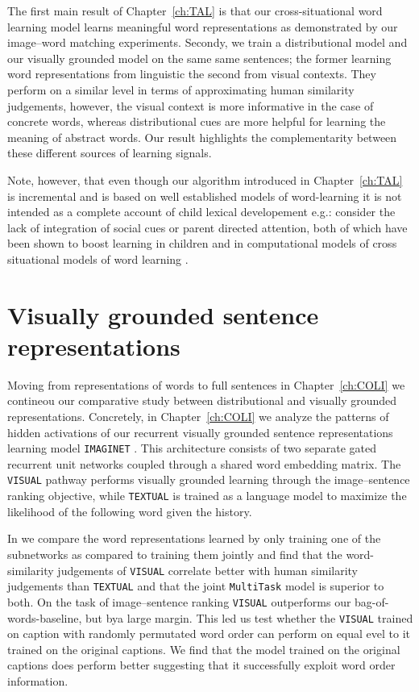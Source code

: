 The first main result of Chapter~\ref{ch:TAL} is that our cross-situational word learning model learns
meaningful word representations as demonstrated by our image--word matching experiments. 
Secondy, we train a distributional model and our visually grounded model on the same same sentences;
the former learning word representations from linguistic the second from visual contexts. 
They perform on a similar level in terms of approximating human similarity judgements, however,
the visual context is more informative in the case of concrete words, whereas distributional cues 
are more helpful for learning the meaning of abstract words. Our result highlights the complementarity
between these different sources of learning signals.

Note, however, that even though our algorithm introduced in Chapter~\ref{ch:TAL} is incremental
and is based on well established models of word-learning \citep{fazly.etal.10} it is not intended as a
complete account of child lexical developement e.g.: consider 
the lack of integration of social cues or parent directed attention, both of which 
have been shown to boost learning in children 
\citep{gleitman1990structural,tomasello1995two} and in computational models of cross situational
models of word learning \citep{yu2007unified,lazazaridou2016multimodal}.

\section{Visually grounded sentence representations}
Moving from representations of words to full sentences in Chapter~\ref{ch:COLI} we contineou 
our comparative study between distributional and visually grounded representations. 
Concretely, in Chapter~\ref{ch:COLI} we analyze the patterns of hidden activations of 
our recurrent visually grounded sentence representations learning model 
\texttt{IMAGINET} \citep{chrupala2015learning}. This architecture consists of two separate gated
recurrent unit networks coupled through a shared word embedding matrix. The \texttt{VISUAL}
pathway performs visually grounded learning through the image--sentence ranking objective, 
while \texttt{TEXTUAL} is trained as a language model to maximize the likelihood of the following word
given the history.

In  \citep{chrupala2015learning} we compare the word representations learned by only training one
of the subnetworks as compared to training them jointly and find that the word-similarity judgements 
of \texttt{VISUAL} correlate better with human similarity judgements than \texttt{TEXTUAL} and that 
the joint \texttt{MultiTask} model is superior to both. On the task of image--sentence ranking 
\texttt{VISUAL} outperforms our bag-of-words-baseline, but bya large margin. This led us test
whether the \texttt{VISUAL} trained on caption with randomly permutated word order can perform 
on equal evel to it trained on the original captions. We find that the model trained on the original
captions does perform better suggesting that it successfully exploit word order information.

